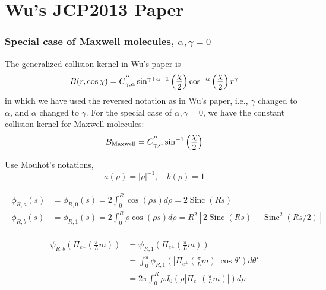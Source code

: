 \documentclass[11pt]{amsart}
\newcommand{\Sinc}{\operatorname{Sinc}}
\begin{document}
\section{Wu's JCP2013 Paper}

\subsubsection{Special case of Maxwell molecules, $\alpha,\gamma=0$}

The generalized collision kernel in Wu's paper is
\begin{equation}
B(r,\cos \chi) = C^{''}_{\gamma,\alpha}\sin^{\gamma+\alpha-1}\left ( {\chi \over 2}\right)\cos^{-\alpha}\left ( {\chi \over 2}\right)r^{\gamma}
\end{equation}
in which we have used the reversed notation as in Wu's paper, i.e., $\gamma$ changed to $\alpha$, and $\alpha$ changed to $\gamma$. For the special case of $\alpha,\gamma=0$, we have the constant collision kernel for Maxwell molecules:
\begin{equation}
B_\text{Maxwell} =   C^{''}_{\gamma,\alpha} \sin^{-1}\left ( {\chi \over 2}\right)
\end{equation}

Use Mouhot's notations,
\begin{equation*}
a(\rho) = |\rho|^{-1},\quad b(\rho) = 1
\end{equation*}

\begin{align*}
\begin{split}
\phi_{R, a}(s) &=\phi_{R, 0}(s)  =  2 \int_{0}^{R} \cos (\rho s) d \rho = 2\Sinc(Rs)\\
\phi_{R, b}(s) &=\phi_{R, 1}(s) =  2 \int_{0}^{R} \rho \cos (\rho s) d \rho = R^2[2\Sinc(Rs) - \Sinc^2(Rs/2)]
\end{split}
\end{align*}

\begin{multline*}
\begin{split}
\psi_{R,b}\left(\Pi_{e^{\perp}}\left(\frac{\pi}{L}m \right) \right ) &=\psi_{R,1}\left(\Pi_{e^{\perp}}\left(\frac{\pi}{L}m \right) \right )   \\
& = \int_0^{\pi}  \phi_{R,1}\left( \left\vert\Pi_{e^{\perp}}\left(\frac{\pi}{L}m \right) \right \vert \cos \theta' \right) d \theta'  \\ 
&  = 2\pi \int_0^R \rho J_0\left(\rho\left \vert \Pi_{e^{\perp}}\left(\frac{\pi}{L}m \right) \right \vert \right) d\rho
\end{split}
\end{multline*}
\end{document}
